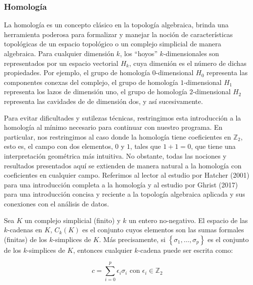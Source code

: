 \subsubsection*{Homolog\'ia}

La homolog\'ia es un concepto cl\'asico en la topolog\'ia algebraica, brinda una herramienta poderosa
para formalizar y manejar la noci\'on de caracter\'isticas topol\'ogicas de un espacio topol\'ogico o
un complejo simplicial de manera algebraica. Para cualquier dimensi\'on $k$, los ``hoyos''
$k$-dimensionales son representados por un espacio vectorial $H_{k}$, cuya dimeni\'on es el n\'umero
de dichas propiedades. Por ejemplo, el grupo de homolog\'ia $0$-dimensional $H_{0}$ representa las
componentes conexas del complejo, el grupo de homolog\'ia $1$-dimensional $H_{1}$ representa los lazos
de dimensi\'on uno, el grupo de homolog\'ia $2$-dimensional $H_{2}$ representa las cavidades de
de dimensi\'on dos, y as\'i sucesivamente.

Para evitar dificultades y sutilezas t\'ecnicas, restringimos esta introducci\'on a la homolog\'ia al
m\'inimo necesario para continuar con nuestro programa. En particular, nos restringimos al caso
donde la homolog\'ia tiene coeficientes en $\mathbb{Z}_{2}$, esto es, el campo con dos elementos,
$0$ y $1$, tales que $1 + 1 = 0$, que tiene una interpretaci\'on geom\'etrica m\'as intuitiva. No
obstante, todas las nociones y resultados presentados aqu\'i se extienden de manera natural a la
homolog\'ia con coeficientes en cualquier campo. Referimos al lector al estudio por Hatcher
(2001) \cite{Hatcher2001} para una introducci\'on completa a la homolog\'ia y al estudio por Ghrist
(2017) \cite{Ghrist2017} para una introducci\'on concisa y reciente a la topolog\'ia algebraica
aplicada y sus conexiones con el an\'alisis de datos.

Sea $K$ un complejo simplicial (finito) y $k$ un entero no-negativo. El espacio de las $k$-cadenas en
$K$, $C_{k}\left(K\right)$ es el conjunto cuyos elementos son las sumas formales (finitas) de los
$k$-simplices de $K$. M\'as precisamente, si $\left\{\sigma_{1},\dots,\sigma_{p}\right\}$ es el
conjunto de los $k$-simplices de $K$, entonces cualquier $k$-cadena puede ser escrita como:

\begin{equation*}
    c = \sum_{i=0}^{p}\epsilon_{i}\sigma_{i} \text{ con } \epsilon_{i}\in\mathbb{Z}_{2} 
\end{equation*}

